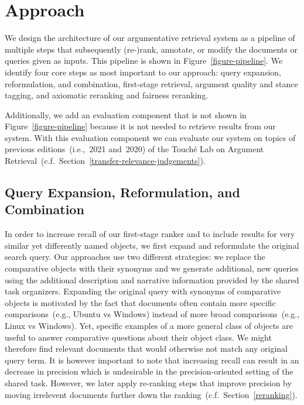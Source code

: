 \section{Approach}\label{approach}



We design the architecture of our argumentative retrieval system as a pipeline of multiple steps that subsequently (re-)rank, annotate, or modify the documents or queries given as inputs. This pipeline is shown in Figure~\ref{figure-pipeline}.
We identify four core steps as most important to our approach:
\Ni query expansion, reformulation, and combination,
\Nii first-stage retrieval,
\Niii argument quality and stance tagging,
and \Niv axiomatic reranking and fairness reranking.

Additionally, we add an evaluation component that is not shown in Figure~\ref{figure-pipeline} because it is not needed to retrieve results from our system.
With this evaluation component we can evaluate our system on topics of previous editions~(i.e.,~2021 and~2020) of the Touché Lab on Argument Retrieval~(c.f.~Section~\ref{transfer-relevance-judgements}).

\subsection{Query Expansion, Reformulation, and Combination}
\label{reformulation}

In order to increase recall of our first-stage ranker and to include results for very similar yet differently named objects, we first expand and reformulate the original search query.
Our approaches use two different strategies: \Ni we replace the comparative objects with their synonyms and \Nii we generate additional, new queries using the additional description and narrative information provided by the shared task organizers.
Expanding the original query with synonyms of comparative objects is motivated by the fact that documents often contain more specific comparisons~(e.g., Ubuntu vs Windows) instead of more broad comparisons~(e.g., Linux vs Windows).
Yet, specific examples of a more general class of objects are useful to answer comparative questions about their object class.
We might therefore find relevant documents that would otherwise not match any original query term.
It is however important to note that increasing recall can result in an decrease in precision which is undesirable in the precision-oriented setting of the shared task.
However, we later apply re-ranking steps that improve precision by moving irrelevent documents further down the ranking~(c.f.~Section~\ref{reranking}).

